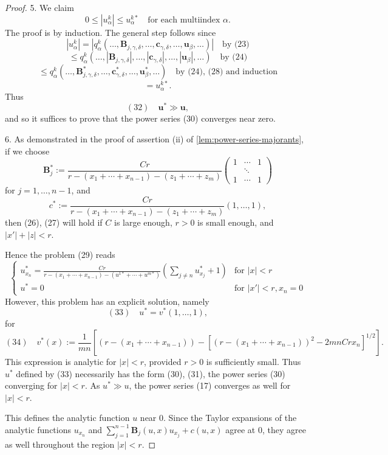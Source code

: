 \begin{proof}
5. We claim
$$0\le |u^k_\alpha| \le u^{k*}_\alpha \quad \text{for each multiindex } \alpha.$$
The proof is by induction. The general step follows since
$$|u_\alpha^k| = |q_\alpha^k(\ldots,\mathbf{B}_{j,\gamma,\delta},\ldots,\mathbf{c}_{\gamma,\delta},\ldots,\mathbf{u}_\beta,\ldots)| \quad \text{by (23)}$$
$$\le q_\alpha^k(\ldots,|\mathbf{B}_{j,\gamma,\delta}|,\ldots,|\mathbf{c}_{\gamma,\delta}|,\ldots,|\mathbf{u}_\beta|,\ldots) \quad \text{by (24)}$$
$$\le q_\alpha^k(\ldots,\mathbf{B}^*_{j,\gamma,\delta},\ldots,\mathbf{c}^*_{\gamma,\delta},\ldots,\mathbf{u}^*_\beta,\ldots) \quad \text{by (24), (28) and induction}$$
$$= u_\alpha^{k*}.$$
Thus
$$(32) \quad \mathbf{u}^* \gg \mathbf{u},$$
and so it suffices to prove that the power series (30) converges near zero.

6. As demonstrated in the proof of assertion (ii) of \cref{lem:power-series-majorants}, if we choose
$$\mathbf{B}^*_j := \frac{Cr}{r-(x_1+\cdots+x_{n-1})-(z_1+\cdots+z_m)}\begin{pmatrix} 1 & \cdots & 1 \\ & \ddots & \\ 1 & \cdots & 1 \end{pmatrix}$$
for $j = 1,\ldots,n-1$, and
$$c^* := \frac{Cr}{r-(x_1+\cdots+x_{n-1})-(z_1+\cdots+z_m)}(1,\ldots,1),$$
then (26), (27) will hold if $C$ is large enough, $r > 0$ is small enough, and $|x'| + |z| < r$.

Hence the problem (29) reads
$$\begin{cases}
u^*_{x_n} = \frac{Cr}{r - (x_1 + \cdots + x_{n-1}) - (u^{1*} + \cdots + u^{m*})} \left(\sum_{j \neq n} u^*_{x_j} + 1\right) & \text{for } |x| < r \\
u^* = 0 & \text{for } |x'| < r, x_n = 0
\end{cases}$$
However, this problem has an explicit solution, namely
$$(33) \quad u^* = v^*(1, \ldots, 1),$$
for
$$(34) \quad v^*(x) := \frac{1}{mn}\left[(r - (x_1 + \cdots + x_{n-1})) - \left[(r - (x_1 + \cdots + x_{n-1}))^2 - 2mnCrx_n\right]^{1/2}\right].$$
This expression is analytic for $|x| < r$, provided $r > 0$ is sufficiently small. Thus $u^*$ defined by (33) necessarily has the form (30), (31), the power series (30) converging for $|x| < r$. As $u^* \gg u$, the power series (17) converges as well for $|x| < r$.

This defines the analytic function $u$ near 0. Since the Taylor expansions of the analytic functions $u_{x_n}$ and $\sum_{j=1}^{n-1} \mathbf{B}_j(u,x)u_{x_j} + c(u,x)$ agree at 0, they agree as well throughout the region $|x| < r$.
\end{proof}

